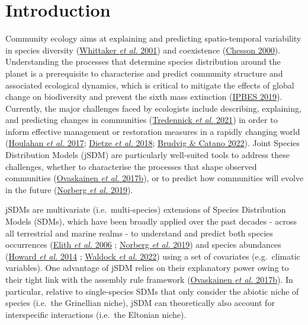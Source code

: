 \documentclass[9pt,biorxiv,doublespacing,lineno,endfloat]{lapreprint}
\begin{document}
\hypertarget{introduction}{%
\section{Introduction}\label{introduction}}

Community ecology aims at explaining and predicting spatio-temporal
variability in species diversity
(\protect\hyperlink{ref-Whittaker_2001}{Whittaker \emph{et al.} 2001})
and coexistence (\protect\hyperlink{ref-Chesson_2000}{Chesson 2000}).
Understanding the processes that determine species distribution around
the planet is a prerequisite to characterise and predict community
structure and associated ecological dynamics, which is critical to
mitigate the effects of global change on biodiversity and prevent the
sixth mass extinction (\protect\hyperlink{ref-ipbes_2019}{IPBES 2019}).
Currently, the major challenges faced by ecologists include describing,
explaining, and predicting changes in communities
(\protect\hyperlink{ref-Tredennick_2021}{Tredennick \emph{et al.} 2021})
in order to inform effective management or restoration measures in a
rapidly changing world (\protect\hyperlink{ref-Houlahan_2017}{Houlahan
\emph{et al.} 2017}; \protect\hyperlink{ref-Dietze_2018}{Dietze \emph{et
al.} 2018}; \protect\hyperlink{ref-Brudvig_2022}{Brudvig \& Catano
2022}). Joint Species Distribution Models (jSDM) are particularly
well-suited tools to address these challenges, whether to characterise
the processes that shape observed communities
(\protect\hyperlink{ref-Ovaskainen_2017a}{Ovaskainen \emph{et al.}
2017b}), or to predict how communities will evolve in the future
(\protect\hyperlink{ref-Norberg_2019}{Norberg \emph{et al.} 2019}).

jSDMs are multivariate (i.e.~multi-species) extensions of Species
Distribution Models (SDMs), which have been broadly applied over the
past decades - across all terrestrial and marine realms - to understand
and predict both species occurrences
(\protect\hyperlink{ref-Elith_2006}{Elith \emph{et al.} 2006} ;
\protect\hyperlink{ref-Norberg_2019}{Norberg \emph{et al.} 2019}) and
species abundances (\protect\hyperlink{ref-Howard_2014}{Howard \emph{et
al.} 2014} ; \protect\hyperlink{ref-Waldock_2022}{Waldock \emph{et al.}
2022}) using a set of covariates (e.g.~climatic variables). One
advantage of jSDM relies on their explanatory power owing to their tight
link with the assembly rule framework
(\protect\hyperlink{ref-Ovaskainen_2017a}{Ovaskainen \emph{et al.}
2017b}). In particular, relative to single-species SDMs that only
consider the abiotic niche of species (i.e.~the Grinellian niche), jSDM
can theoretically also account for interspecific interactions (i.e.~the
Eltonian niche).
\end{document}
